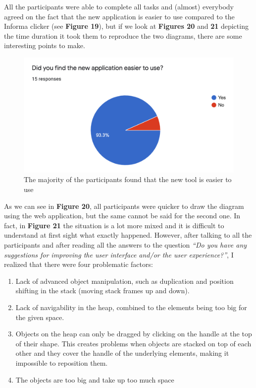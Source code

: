 \documentclass[]{usiinfbachelorproject}
\begin{document}
All the participants were able to complete all tasks and (almost) everybody agreed on the fact that the new application is easier to use compared to the Informa clicker (see \textbf{Figure 19}), but if we look at \textbf{Figures 20} and \textbf{21} depicting the time duration it took them to reproduce the two diagrams, there are some interesting points to make.

\begin{figure}[h!]
\centering
\includegraphics[scale=0.6]{figures/ease-of-use.png}
\caption {The majority of the participants found that the new tool is easier to use}
\end{figure}

\bigskip

\noindent As we can see in \textbf{Figure 20}, all participants were quicker to draw the diagram using the web application, but the same cannot be said for the second one. In fact, in \textbf{Figure 21} the situation is a lot more mixed and it is difficult to understand at first sight what exactly happened. However, after talking to all the participants and after reading all the answers to the question \emph{``Do you have any suggestions for improving the user interface and/or the user experience?''}, I realized that there were four problematic factors:

\begin{enumerate}
	\item Lack of advanced object manipulation, such as duplication and position shifting in the stack (moving stack frames up and down).
	\item Lack of navigability in the heap, combined to the elements being too big for the given space.
	\item Objects on the heap can only be dragged by clicking on the handle at the top of their shape. This creates problems when objects are stacked on top of each other and they cover the handle of the underlying elements, making it impossible to reposition them.
	\item The objects are too big and take up too much space
\end{enumerate}
\end{document}
